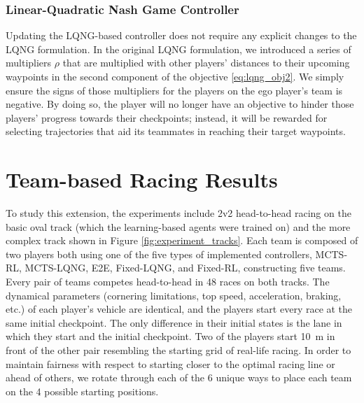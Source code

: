 \subsubsection{Linear-Quadratic Nash Game Controller}
Updating the LQNG-based controller does not require any explicit changes to the LQNG formulation. In the original LQNG formulation, we introduced a series of multipliers $\rho$ that are multiplied with other players' distances to their upcoming waypoints in the second component of the objective \eqref{eq:lqng_obj2}. We simply ensure the signs of those multipliers for the players on the ego player's team is negative. By doing so, the player will no longer have an objective to hinder those players' progress towards their checkpoints; instead, it will be rewarded for selecting trajectories that aid its teammates in reaching their target waypoints. 

\section{Team-based Racing Results}
To study this extension, the experiments include 2v2 head-to-head racing on the basic oval track (which the learning-based agents were trained on) and the more complex track shown in Figure \ref{fig:experiment_tracks}. Each team is composed of two players both using one of the five types of implemented controllers, MCTS-RL, MCTS-LQNG, E2E, Fixed-LQNG, and Fixed-RL, constructing five teams. Every pair of teams competes head-to-head in 48 races on both tracks. The dynamical parameters (cornering limitations, top speed, acceleration, braking, etc.) of each player's vehicle are identical, and the players start every race at the same initial checkpoint. The only difference in their initial states is the lane in which they start and the initial checkpoint. Two of the players start \SI{10}{\meter} in front of the other pair resembling the starting grid of real-life racing. In order to maintain fairness with respect to starting closer to the optimal racing line or ahead of others, we rotate through each of the 6 unique ways to place each team on the 4 possible starting positions.

